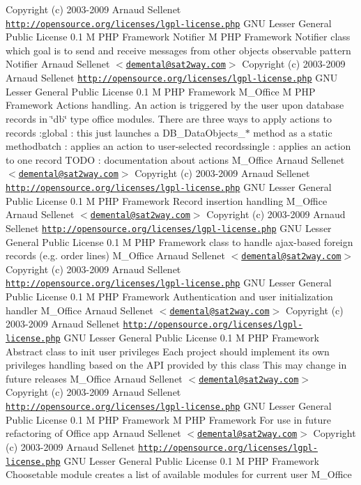 \begin{Desc}
Copyright (c) 2003-2009 Arnaud Sellenet  \href{http://opensource.org/licenses/lgpl-license.php}{\tt http://opensource.org/licenses/lgpl-license.php} GNU Lesser General Public License  0.1  M PHP Framework   Notifier  M PHP Framework  Notifier class which goal is to send and receive messages from other objects  observable pattern   Notifier  Arnaud Sellenet $<$\href{mailto:demental@sat2way.com}{\tt demental@sat2way.com}$>$  Copyright (c) 2003-2009 Arnaud Sellenet  \href{http://opensource.org/licenses/lgpl-license.php}{\tt http://opensource.org/licenses/lgpl-license.php} GNU Lesser General Public License  0.1  M PHP Framework   M\_\-Office  M PHP Framework  Actions handling. An action is triggered by the user upon database records in \char`\"{}db\char`\"{} type office modules. There are three ways to apply actions to records :global : this just launches a DB\_\-DataObjects\_\-$\ast$ method as a static methodbatch : applies an action to user-selected recordssingle : applies an action to one record TODO : documentation about actions   M\_\-Office  Arnaud Sellenet $<$\href{mailto:demental@sat2way.com}{\tt demental@sat2way.com}$>$  Copyright (c) 2003-2009 Arnaud Sellenet  \href{http://opensource.org/licenses/lgpl-license.php}{\tt http://opensource.org/licenses/lgpl-license.php} GNU Lesser General Public License  0.1  M PHP Framework  Record insertion handling   M\_\-Office  Arnaud Sellenet $<$\href{mailto:demental@sat2way.com}{\tt demental@sat2way.com}$>$  Copyright (c) 2003-2009 Arnaud Sellenet  \href{http://opensource.org/licenses/lgpl-license.php}{\tt http://opensource.org/licenses/lgpl-license.php} GNU Lesser General Public License  0.1  M PHP Framework  class to handle ajax-based foreign records (e.g. order lines)   M\_\-Office  Arnaud Sellenet $<$\href{mailto:demental@sat2way.com}{\tt demental@sat2way.com}$>$  Copyright (c) 2003-2009 Arnaud Sellenet  \href{http://opensource.org/licenses/lgpl-license.php}{\tt http://opensource.org/licenses/lgpl-license.php} GNU Lesser General Public License  0.1  M PHP Framework  Authentication and user initialization handler   M\_\-Office  Arnaud Sellenet $<$\href{mailto:demental@sat2way.com}{\tt demental@sat2way.com}$>$  Copyright (c) 2003-2009 Arnaud Sellenet  \href{http://opensource.org/licenses/lgpl-license.php}{\tt http://opensource.org/licenses/lgpl-license.php} GNU Lesser General Public License  0.1  M PHP Framework  Abstract class to init user privileges Each project should implement its own privileges handling based on the API provided by this class This may change in future releases   M\_\-Office  Arnaud Sellenet $<$\href{mailto:demental@sat2way.com}{\tt demental@sat2way.com}$>$  Copyright (c) 2003-2009 Arnaud Sellenet  \href{http://opensource.org/licenses/lgpl-license.php}{\tt http://opensource.org/licenses/lgpl-license.php} GNU Lesser General Public License  0.1  M PHP Framework    M PHP Framework  For use in future refactoring of Office app    Arnaud Sellenet $<$\href{mailto:demental@sat2way.com}{\tt demental@sat2way.com}$>$  Copyright (c) 2003-2009 Arnaud Sellenet  \href{http://opensource.org/licenses/lgpl-license.php}{\tt http://opensource.org/licenses/lgpl-license.php} GNU Lesser General Public License  0.1  M PHP Framework  Choosetable module creates a list of available modules for current user   M\_\-Office  
\end{Desc}
